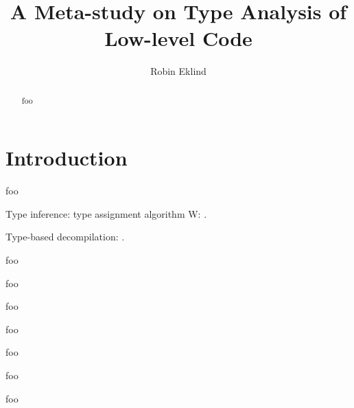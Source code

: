 \documentclass[10pt, a4paper, sigplan]{acmart}
\title{A Meta-study on Type Analysis of Low-level Code}
\author{Robin Eklind}
\affiliation{
	\institution{Royal Institute of Technology (KTH)}
	\city{Stockholm}
	\country{Sweden}
}
\begin{document}


\begin{abstract}
foo
\end{abstract}


\maketitle





\section{Introduction}

foo

Type inference: type assignment algorithm W: \cite{milner_algorithmw}.

Type-based decompilation: \cite{mycroft_type_based_decompilation}.


foo \cite{reverse_engineering_of_types}

foo \cite{scalable_type_detection}

foo \cite{bintype}

foo \cite{type_inference_on_executables}

foo \cite{dynstruct}

foo \cite{polymorphic_type_inference_for_machine_code}



\clearpage

foo

\clearpage



%
\end{document}
